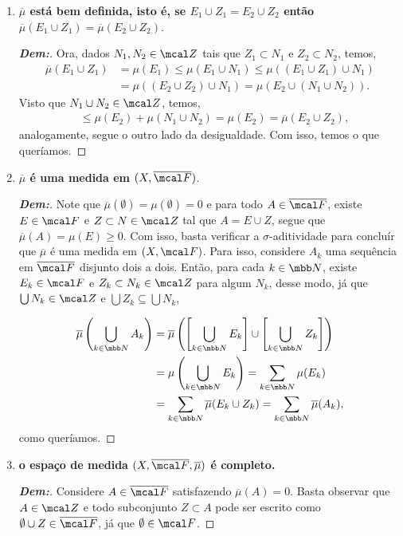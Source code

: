 \begin{enumerate}[label=(\alph*), wide, labelindent=0pt]
  \item \textbf{$\overline \mu$ está bem definida, isto é, 
    se $E_1 \cup Z_1 = E_2 \cup Z_2$ então $\overline \mu (E_1 \cup Z_1) = 
    \overline \mu (E_2 \cup Z_2)$}.
    \begin{proof}[\textbf{Dem:}]Ora, dados $N_1, N_2 \in \mcal Z$ tais que $Z_1 \subset N_1$ 
      e $Z_2 \subset N_2$, temos,
      \begin{align*}
        \overline{\mu}(E_1\cup Z_1) &= \mu(E_1) \le \mu(E_1 \cup N_1)
        \le \mu((E_1 \cup Z_1) \cup N_1)\\
        &=\mu((E_2 \cup Z_2) \cup N_1) = \mu(E_2 \cup (N_1 \cup N_2)).
      \end{align*}
      Visto que $N_1 \cup N_2 \in \mcal Z$, temos,
      \begin{align*}
        &\le\mu(E_2) + \mu(N_1 \cup N_2) = \mu(E_2) = \overline{\mu}(E_2 \cup Z_2), 
      \end{align*}
      analogamente, segue o outro lado da desigualdade. Com isso, temos o que queríamos.
    \end{proof}
  \item \textbf{$\overline \mu$ é uma medida em $(X, \overline{\mcal F})$}. 
    \begin{proof}[\textbf{Dem:}]
      Note que $\overline\mu(\emptyset) = \mu(\emptyset) = 0$ e para todo $A \in 
      \overline{\mcal F}$, existe $E \in \mcal F$ e $Z \subset N \in \mcal Z$ tal que 
      $A = E \cup Z$, 
      segue que $\overline \mu(A) = \mu(E) \ge 0$. Com isso, basta verificar a 
      $\sigma$-aditividade para concluír que $\overline \mu$ é uma medida em $(X, \mcal F)$.
      Para isso, considere ${A_k}$ uma sequência em $\overline{\mcal F}$ 
      disjunto dois a dois. Então, para 
      cada $k \in \mbb N$, existe $E_k \in \mcal F$ e $Z_k \subset N_k \in \mcal Z$ 
      para algum $N_k$, desse modo, já que $\bigcup N_k \in \mcal Z$ e 
      $\bigcup Z_k \subseteq \bigcup N_k$, 

      \begin{align*}
        \overline \mu\left(\bigcup_{k \in \mbb N} A_k \right) &=
        \overline\mu\left(\left[\bigcup_{k \in \mbb N} E_k \right] \cup 
        \left[\bigcup_{k \in \mbb N} Z_k \right]\right)\\ 
        &= \mu\left(\bigcup_{k \in \mbb N} E_k\right) = 
        \sum_{k \in \mbb N} \mu(E_k)\\
        &= \sum_{k \in \mbb N} \overline \mu(E_k \cup Z_k)
        =\sum_{k \in \mbb N} \overline \mu(A_k),
      \end{align*}
      como queríamos.
    \end{proof}
  \item \textbf{o espaço de medida $(X, \overline{\mcal F}, \overline \mu)$ é completo.}
    \begin{proof}[\textbf{Dem:}] Considere $A \in \overline{\mcal F}$ satisfazendo 
      $\overline{\mu}(A) = 0$. Basta observar que $A \in \mcal Z$ e 
      todo subconjunto $Z \subset A$
      pode ser escrito como $\emptyset \cup Z \in \overline{\mcal F}$, já que 
      $\emptyset \in \mcal F$. 
            

\end{proof}
\end{enumerate}
